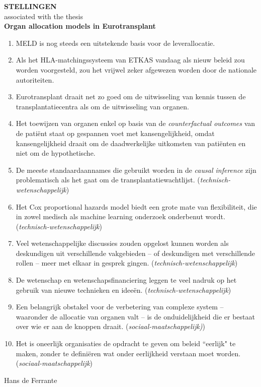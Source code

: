 \documentclass[12pt]{article}
\begin{document}
	\vfill
	
	\newpage
	
		\begin{center}
			{\Large \textbf{STELLINGEN}}\\[1em]
			\setmainfont{PT Serif}
			{\large associated with the thesis}\\[1em]
			{\large \textbf{Organ allocation models in Eurotransplant}}\\[0.5em]
		\end{center}
		\vspace{1em}
	
		\begin{enumerate}[leftmargin=1cm, label=\textbf{\arabic*.}]
		\item MELD is nog steeds een uitstekende basis voor de leverallocatie.
		\item Als het HLA-matchingssysteem van ETKAS vandaag als nieuw beleid zou worden voorgesteld, zou het vrijwel zeker afgewezen worden door de nationale autoriteiten.	
		\item Eurotransplant draait net zo goed om de uitwisseling van kennis tussen de transplantatiecentra als om de uitwisseling van organen.	
		\item Het toewijzen van organen enkel op basis van de \textit{counterfactual outcomes} van de patiënt staat op gespannen voet met kansengelijkheid, omdat kansengelijkheid draait om de daadwerkelijke uitkomsten van patiënten en niet om de hypothetische.
		\item De meeste standaardaannames die gebruikt worden in de \textit{causal inference} zijn problematisch als het gaat om de transplantatiewachtlijst. (\textit{technisch-wetenschappelijk})
		\item Het Cox proportional hazards model biedt een grote mate van flexibiliteit, die in zowel medisch als machine learning onderzoek onderbenut wordt.\\ (\textit{technisch-wetenschappelijk})
		\item Veel wetenschappelijke discussies zouden opgelost kunnen worden als deskundigen uit verschillende vakgebieden -- of deskundigen met verschillende rollen -- meer met elkaar in gesprek gingen. (\textit{technisch-wetenschappelijk})
		\item De wetenschap en wetenschapsfinanciering leggen te veel nadruk op het gebruik van nieuwe technieken en ideeën. (\textit{technisch-wetenschappelijk})
		\item Een belangrijk obstakel voor de verbetering van complexe system -- waaronder de allocatie van organen valt -- is de onduidelijkheid die er bestaat over wie er aan de knoppen draait.	(\textit{sociaal-maatschappelijk)})
		\item Het is oneerlijk organisaties de opdracht te geven om beleid ``eerlijk" te maken, zonder te definiëren wat onder eerlijkheid verstaan moet worden.\\ (\textit{sociaal-maatschappelijk})

	\end{enumerate}
	\vfill
	\begin{center}
		{\small Hans de Ferrante}
	\end{center}
	
	
\end{document}
